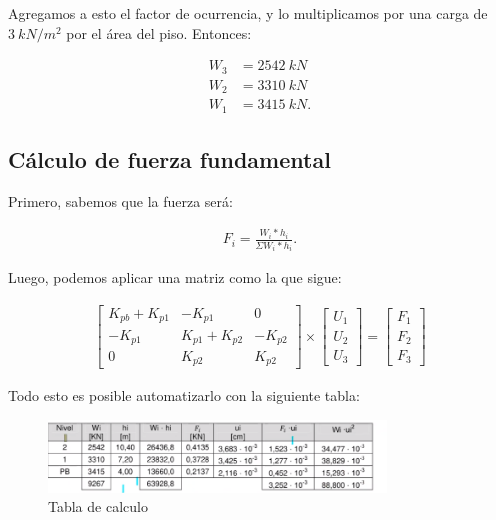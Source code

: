 \documentclass[../main.tex]{subfiles}
\begin{document}
Agregamos a esto el factor de ocurrencia, y lo multiplicamos por una carga de
$\SI{3}{kN / m^2}$ por el área del piso. Entonces:

\begin{align*}
  W_3 &= \SI{2542}{kN} \\[5pt]
  W_2 &= \SI{3310}{kN} \\[5pt]
  W_1 &= \SI{3415}{kN}
.\end{align*}

\subsection{Cálculo de fuerza fundamental}

Primero, sabemos que la fuerza será:

\begin{align*}
  F_i = \frac{W_i*h_i}{\Sigma W_i * h_i}
.\end{align*}

Luego, podemos aplicar una matriz como la que sigue:

\begin{align*}
\begin{bmatrix} 
  K_{pb}+K_{p1} & -K_{p1}       & 0 \\
  -K_{p1}       & K_{p1}+K_{p2} & -K_{p2} \\
  0             & K_{p2}        & K_{p2} 
\end{bmatrix} 
\times \begin{bmatrix} U_1 \\ U_2 \\ U_3 \end{bmatrix} 
= \begin{bmatrix} F_1 \\ F_2 \\ F_3 \end{bmatrix} 
\tag{Matriz deformaciones}\label{matriz-def}\end{align*}

Todo esto es posible automatizarlo con la siguiente tabla:

\begin{figure}[ht]
  \centering
  \includegraphics[width=0.8\textwidth]{../images/20210420/tabla_calc}
  \caption{Tabla de calculo}
  \label{fig:tabla_calc}
\end{figure}
\end{document}
